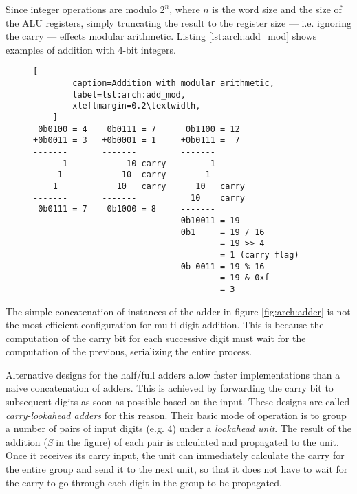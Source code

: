 Since integer operations are modulo $2^n$, where $n$ is the word size and the
size of the ALU registers, simply truncating the result to the register size ---
i.e. ignoring the carry --- effects modular arithmetic.  Listing
\ref{lst:arch:add_mod} shows examples of addition with 4-bit integers.

\begin{figure}[ht]
    \begin{lstlisting}[
        caption=Addition with modular arithmetic,
        label=lst:arch:add_mod,
        xleftmargin=0.2\textwidth,
    ]
 0b0100 = 4    0b0111 = 7      0b1100 = 12
+0b0011 = 3   +0b0001 = 1     +0b0111 =  7
-------       -------         -------
      1            10 carry         1
     1            10  carry        1
    1            10   carry      10   carry
-------       -------           10    carry
 0b0111 = 7    0b1000 = 8     -------
                              0b10011 = 19
                              0b1     = 19 / 16
                                      = 19 >> 4
                                      = 1 (carry flag)
                              0b 0011 = 19 % 16
                                      = 19 & 0xf
                                      = 3
    \end{lstlisting}
\end{figure}

\begin{aside}
    The simple concatenation of instances of the adder in figure
    \ref{fig:arch:adder} is not the most efficient configuration for multi-digit
    addition.  This is because the computation of the carry bit for each
    successive digit must wait for the computation of the previous, serializing
    the entire process.

    Alternative designs for the half/full adders allow faster implementations
    than a naive concatenation of adders.  This is achieved by forwarding the
    carry bit to subsequent digits as soon as possible based on the input.
    These designs are called \textit{carry-lookahead adders} for this reason.
    Their basic mode of operation is to group a number of pairs of input digits
    (e.g. 4) under a \textit{lookahead unit}.  The result of the addition
    (\textit{S} in the figure) of each pair is calculated and propagated to the
    unit.  Once it receives its carry input, the unit can immediately calculate
    the carry for the entire group and send it to the next unit, so that it does
    not have to wait for the carry to go through each digit in the group to be
    propagated.
\end{aside}

